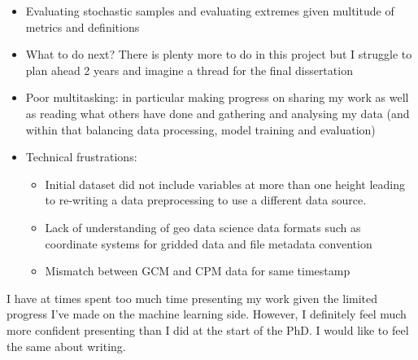 \begin{itemize}
  \item Evaluating stochastic samples and evaluating extremes given multitude of metrics and definitions
  \item What to do next? There is plenty more to do in this project but I struggle to plan ahead 2 years and imagine a thread for the final dissertation
  \item Poor multitasking: in particular making progress on sharing my work as well as reading what others have done and gathering and analysing my data (and within that balancing data processing, model training and evaluation)
  \item Technical frustrations:
    \begin{itemize}
      \item Initial dataset did not include variables at more than one height leading to re-writing a data preprocessing to use a different data source.
      \item Lack of understanding of geo data science data formats such as coordinate systems for gridded data and file metadata convention
      \item Mismatch between GCM and CPM data for same timestamp
    \end{itemize}
\end{itemize}

I have at times spent too much time presenting my work given the limited progress I've made on the machine learning side. However, I definitely feel much more confident presenting than I did at the start of the PhD. I would like to feel the same about writing.
